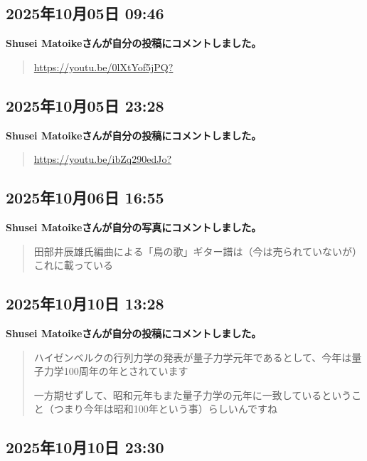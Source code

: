 \subsection*{2025年10月05日 09:46}

\textbf{Shusei Matoikeさんが自分の投稿にコメントしました。}

\begin{quote}
\url{https://youtu.be/0lXtYof5jPQ?}
\end{quote}

\subsection*{2025年10月05日 23:28}

\textbf{Shusei Matoikeさんが自分の投稿にコメントしました。}

\begin{quote}
\url{https://youtu.be/ibZq290edJo?}
\end{quote}

\subsection*{2025年10月06日 16:55}

\textbf{Shusei Matoikeさんが自分の写真にコメントしました。}

\begin{quote}
田部井辰雄氏編曲による「鳥の歌」ギター譜は（今は売られていないが）これに載っている
\end{quote}

\subsection*{2025年10月10日 13:28}

\textbf{Shusei Matoikeさんが自分の投稿にコメントしました。}

\begin{quote}
ハイゼンベルクの行列力学の発表が量子力学元年であるとして、今年は量子力学100周年の年とされています

一方期せずして、昭和元年もまた量子力学の元年に一致しているということ（つまり今年は昭和100年という事）らしいんですね
\end{quote}

\subsection*{2025年10月10日 23:30}

